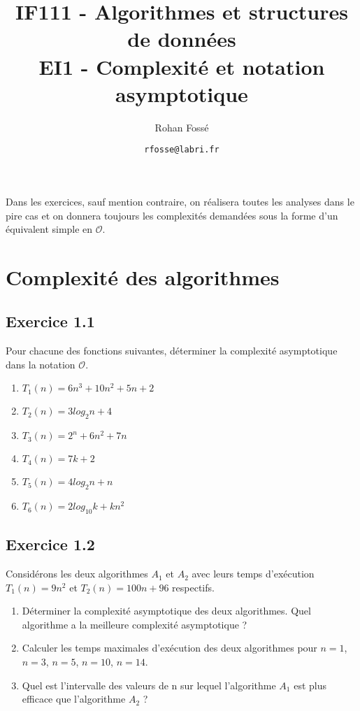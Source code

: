 \documentclass{article}[12pt]
\title{IF111 - Algorithmes et structures de données\\EI1 - Complexité et notation asymptotique}
\date{\texttt{rfosse@labri.fr}}
\author{Rohan Fossé}
\begin{document}
\maketitle{}
Dans les exercices, sauf mention contraire, on réalisera toutes les analyses dans le pire cas et on donnera toujours les complexités demandées sous la forme d'un équivalent simple en $\mathcal{O}$.


\section{Complexité des algorithmes}

\subsection*{Exercice 1.1}



Pour chacune des fonctions suivantes, déterminer la complexité asymptotique dans la notation $\mathcal{O}$.
\begin{tcolorbox}
\begin{enumerate}
    \item $T_1(n) = 6n^3 + 10n^2 + 5n + 2$
    \item $T_2(n) = 3log_2n + 4$
    \item $T_3(n) = 2^n + 6n^2 + 7n $
    \item $T_4(n) = 7k + 2$
    \item $T_5(n) = 4log_2n + n$
    \item $T_6(n) = 2log_{10}k + kn^2$
\end{enumerate}
\end{tcolorbox}

\subsection*{Exercice 1.2}

Considérons les deux algorithmes $A_1$ et $A_2$ avec leurs temps d'exécution $T_1(n) = 9n^2$ et $T_2(n) = 100n + 96$ respectifs.

\begin{enumerate}
    \item Déterminer la complexité asymptotique des deux algorithmes. Quel algorithme a la meilleure complexité asymptotique ?
    \item Calculer les temps maximales d'exécution des deux algorithmes pour $n = 1$, $n = 3$, $n = 5$, $n = 10$, $n = 14$.
    \item Quel est l'intervalle des valeurs de n sur lequel l'algorithme $A_1$ est plus efficace que l'algorithme $A_2$ ?
\end{enumerate}
\end{document}

